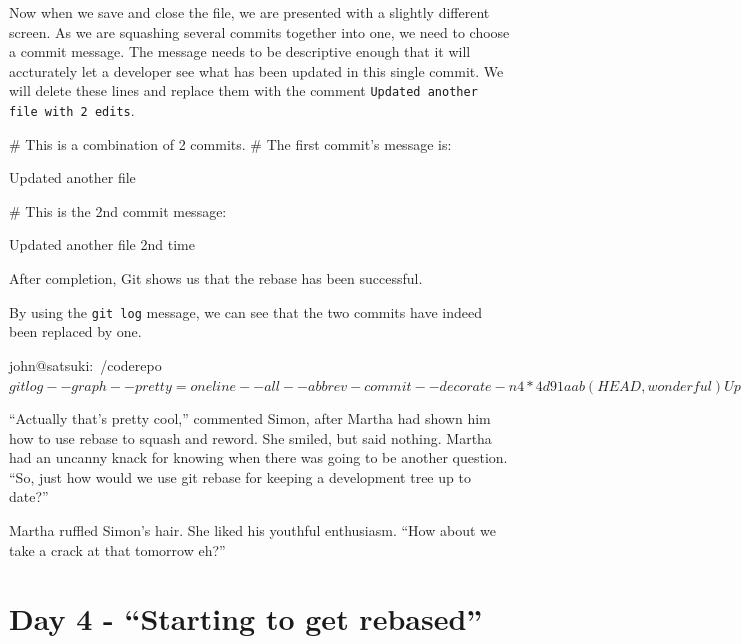 Now when we save and close the file, we are presented with a slightly different screen.
As we are squashing several commits together into one, we need to choose a commit message.
The message needs to be descriptive enough that it will accturately let a developer see what has been updated in this single commit.
We will delete these lines and replace them with the comment \texttt{Updated another file with 2 edits}.

\begin{code}
# This is a combination of 2 commits.
# The first commit's message is:

Updated another file

# This is the 2nd commit message:

Updated another file 2nd time
\end{code}

After completion, Git shows us that the rebase has been successful.


By using the \texttt{git log} message, we can see that the two commits have indeed been replaced by one.

\begin{code}
john@satsuki:~/coderepo$ git log --graph --pretty=oneline --all --abbrev-commit --decorate -n 4
* 4d91aab (HEAD, wonderful) Updated another file again
* 1ffe37f Updated another file with 2 edits
* 1c3206a (master) Added a new file
* 37950f8 Continued Development
john@satsuki:~/coderepo$
\end{code}

\begin{trenches}
``Actually that's pretty cool,'' commented Simon, after Martha had shown him how to use rebase to squash and reword.
She smiled, but said nothing.
Martha had an uncanny knack for knowing when there was going to be another question.
``So, just how would we use git rebase for keeping a development tree up to date?''

Martha ruffled Simon's hair.
She liked his youthful enthusiasm.
``How about we take a crack at that tomorrow eh?''
\end{trenches}

\section{Day 4 - ``Starting to get rebased''}
